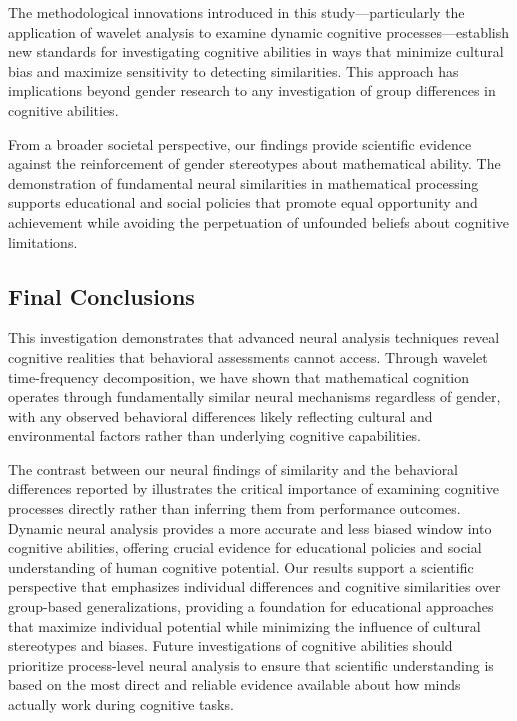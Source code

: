 \documentclass[pdflatex,sn-nature]{sn-jnl}%
\theoremstyle{thmstyleone}%
\theoremstyle{thmstyletwo}%
\theoremstyle{thmstylethree}%
\begin{document}
The methodological innovations introduced in this study—particularly the application of wavelet analysis to examine dynamic cognitive processes—establish new standards for investigating cognitive abilities in ways that minimize cultural bias and maximize sensitivity to detecting similarities. This approach has implications beyond gender research to any investigation of group differences in cognitive abilities.

From a broader societal perspective, our findings provide scientific evidence against the reinforcement of gender stereotypes about mathematical ability. The demonstration of fundamental neural similarities in mathematical processing supports educational and social policies that promote equal opportunity and achievement while avoiding the perpetuation of unfounded beliefs about cognitive limitations.


\subsection{Final Conclusions}
This investigation demonstrates that advanced neural analysis techniques reveal cognitive realities that behavioral assessments cannot access. Through wavelet time-frequency decomposition, we have shown that mathematical cognition operates through fundamentally similar neural mechanisms regardless of gender, with any observed behavioral differences likely reflecting cultural and environmental factors rather than underlying cognitive capabilities.

The contrast between our neural findings of similarity and the behavioral differences reported by \cite{martinot2025mathematical} illustrates the critical importance of examining cognitive processes directly rather than inferring them from performance outcomes. Dynamic neural analysis provides a more accurate and less biased window into cognitive abilities, offering crucial evidence for educational policies and social understanding of human cognitive potential.
Our results support a scientific perspective that emphasizes individual differences and cognitive similarities over group-based generalizations, providing a foundation for educational approaches that maximize individual potential while minimizing the influence of cultural stereotypes and biases. Future investigations of cognitive abilities should prioritize process-level neural analysis to ensure that scientific understanding is based on the most direct and reliable evidence available about how minds actually work during cognitive tasks.
\end{document}
